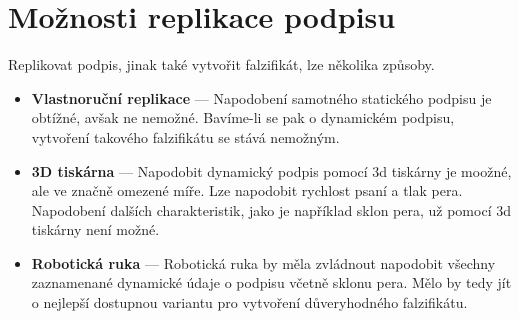 \section{Možnosti replikace podpisu}
Replikovat podpis, jinak také vytvořit falzifikát, lze několika způsoby.

\begin{itemize}
  \item \textbf{Vlastnoruční replikace} --- 
  Napodobení samotného statického podpisu je obtížné, avšak ne nemožné. 
  Bavíme-li se pak o dynamickém podpisu, vytvoření takového falzifikátu se stává nemožným.

  \item \textbf{3D tiskárna} ---
  Napodobit dynamický podpis pomocí 3d tiskárny je moožné, ale ve značně omezené míře.
  Lze napodobit rychlost psaní a tlak pera. 
  Napodobení dalších charakteristik, jako je například sklon pera, už pomocí 3d tiskárny není možné. 

  \item \textbf{Robotická ruka} ---
  Robotická ruka by měla zvládnout napodobit všechny zaznamenané dynamické údaje o podpisu včetně sklonu pera.
  Mělo by tedy jít o nejlepší dostupnou variantu pro vytvoření důveryhodného falzifikátu. 
\end{itemize}





